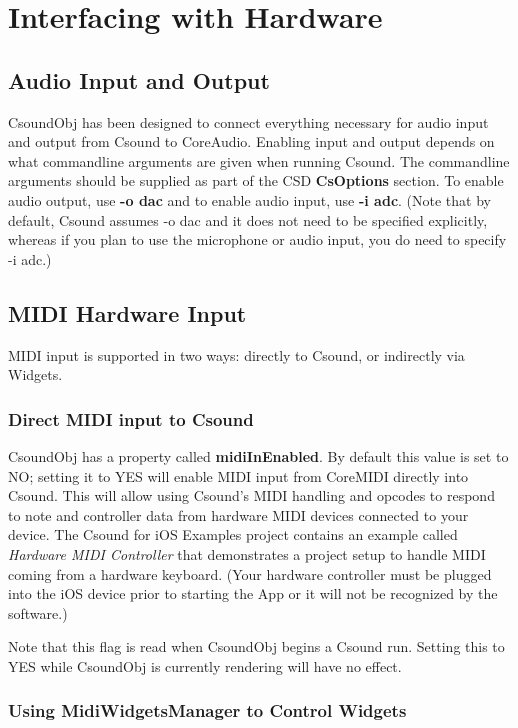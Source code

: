 \documentclass[11pt]{article}
\begin{document}

\section{Interfacing with Hardware}
\subsection{Audio Input and Output}

CsoundObj has been designed to connect everything necessary for audio input and output from Csound to CoreAudio.  Enabling input and output depends on what commandline arguments are given when running Csound.  The commandline arguments should be supplied as part of the CSD \textbf{CsOptions} section.  To enable audio output, use \textbf{-o dac} and to enable audio input, use \textbf{-i adc}. (Note that by default, Csound assumes -o dac and it does not need to be specified explicitly, whereas if you plan to use the microphone or audio input, you do need to specify -i adc.)


\subsection{MIDI Hardware Input}

MIDI input is supported in two ways: directly to Csound, or indirectly via Widgets.

\subsubsection{Direct MIDI input to Csound}

CsoundObj has a property called \textbf{midiInEnabled}.  By default this value is set to NO; setting it to YES will enable MIDI input from CoreMIDI directly into Csound. This will allow using Csound's MIDI handling and opcodes to respond to note and controller data from hardware MIDI devices connected to your device.  The Csound for iOS Examples project contains an example called \emph{Hardware MIDI Controller} that demonstrates a project setup to handle MIDI coming from a hardware keyboard.  (Your hardware controller must be plugged into the iOS device prior to starting the App or it will not be recognized by the software.)

Note that this flag is read when CsoundObj begins a Csound run.  Setting this to YES while CsoundObj is currently rendering will have no effect.

\subsubsection{Using MidiWidgetsManager to Control Widgets}
\end{document}
